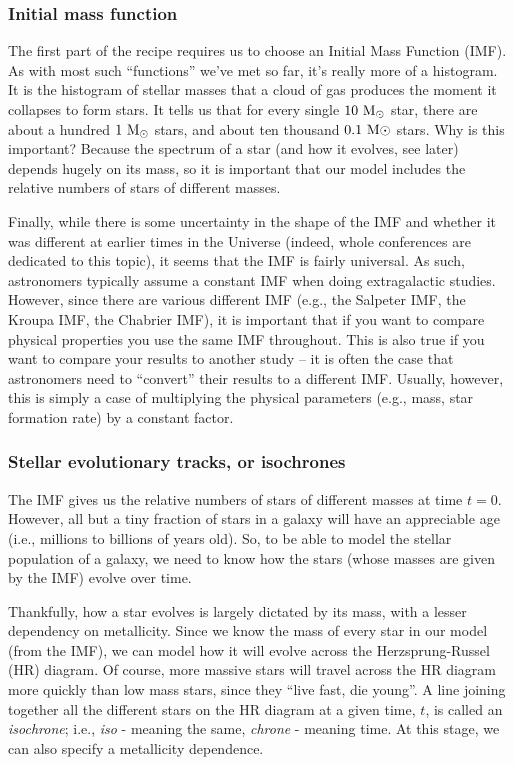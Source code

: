 \documentclass[11pt]{article}
\begin{document}
\subsubsection{Initial mass function}
The first part of the recipe requires us to choose an Initial Mass
Function (IMF). As with most such ``functions'' we've met so far, it's
really more of a histogram. It is the histogram of stellar masses that
a cloud of gas produces the moment it collapses to form stars. It
tells us that for every single ${\rm10~M_\odot}$ star, there are about
a hundred ${\rm1~M_\odot}$ stars, and about ten thousand
${\rm0.1~M\odot}$ stars. Why is this important? Because the spectrum
of a star (and how it evolves, see later) depends hugely on its mass,
so it is important that our model includes the relative numbers of
stars of different masses.

Finally, while there is some uncertainty in the shape of the IMF and
whether it was different at earlier times in the Universe (indeed,
whole conferences are dedicated to this topic), it seems that the IMF
is fairly universal. As such, astronomers typically assume a constant
IMF when doing extragalactic studies. However, since there are various
different IMF (e.g., the Salpeter IMF, the Kroupa IMF, the Chabrier
IMF), it is important that if you want to compare physical properties
you use the same IMF throughout. This is also true if you want to
compare your results to another study -- it is often the case that
astronomers need to ``convert'' their results to a different
IMF. Usually, however, this is simply a case of multiplying the
physical parameters (e.g., mass, star formation rate) by a constant
factor.

\subsubsection{Stellar evolutionary tracks, or isochrones}
The IMF gives us the relative numbers of stars of different masses at
time $t=0$. However, all but a tiny fraction of stars in a galaxy will
have an appreciable age (i.e., millions to billions of years
old). So, to be able to model the stellar population of a galaxy, we
need to know how the stars (whose masses are given by the IMF) evolve
over time.

Thankfully, how a star evolves is largely dictated by its mass, with a
lesser dependency on metallicity. Since we know the mass of every star
in our model (from the IMF), we can model how it will evolve across
the Herzsprung-Russel (HR) diagram. Of course, more massive stars will
travel across the HR diagram more quickly than low mass stars, since
they ``live fast, die young''. A line joining together all the
different stars on the HR diagram at a given time, $t$, is called an
{\it isochrone}; i.e., {\it iso} - meaning the same, {\it chrone} -
meaning time. At this stage, we can also specify a metallicity
dependence.
\end{document}
